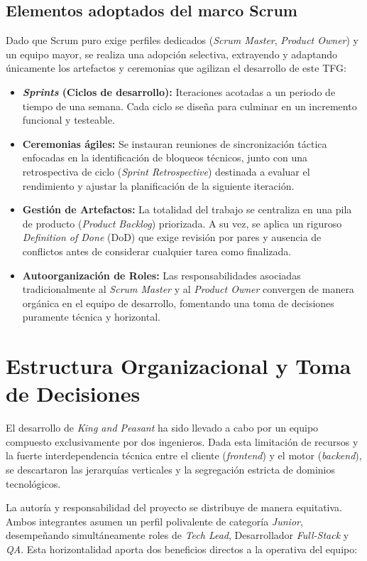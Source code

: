 \subsection{Elementos adoptados del marco Scrum}
Dado que Scrum puro exige perfiles dedicados (\textit{Scrum Master}, \textit{Product Owner}) y un equipo mayor, se realiza una adopción selectiva, extrayendo y adaptando únicamente los artefactos y ceremonias que agilizan el desarrollo de este TFG:

\begin{itemize}
    \item \textbf{\textit{Sprints} (Ciclos de desarrollo):} Iteraciones acotadas a un periodo de tiempo de una semana. Cada ciclo se diseña para culminar en un incremento funcional y testeable.
    \item \textbf{Ceremonias ágiles:} Se instauran reuniones de sincronización táctica enfocadas en la identificación de bloqueos técnicos, junto con una retrospectiva de ciclo (\textit{Sprint Retrospective}) destinada a evaluar el rendimiento y ajustar la planificación de la siguiente iteración.
    \item \textbf{Gestión de Artefactos:} La totalidad del trabajo se centraliza en una pila de producto (\textit{Product Backlog}) priorizada. A su vez, se aplica un riguroso \textit{Definition of Done} (DoD) que exige revisión por pares y ausencia de conflictos antes de considerar cualquier tarea como finalizada.
    \item \textbf{Autoorganización de Roles:} Las responsabilidades asociadas tradicionalmente al \textit{Scrum Master} y al \textit{Product Owner} convergen de manera orgánica en el equipo de desarrollo, fomentando una toma de decisiones puramente técnica y horizontal.
\end{itemize}

\section{Estructura Organizacional y Toma de Decisiones}

El desarrollo de \textit{King and Peasant} ha sido llevado a cabo por un equipo compuesto exclusivamente por dos ingenieros. Dada esta limitación de recursos y la fuerte interdependencia técnica entre el cliente (\textit{frontend}) y el motor (\textit{backend}), se descartaron las jerarquías verticales y la segregación estricta de dominios tecnológicos.

La autoría y responsabilidad del proyecto se distribuye de manera equitativa. Ambos integrantes asumen un perfil polivalente de categoría \textit{Junior}, desempeñando simultáneamente roles de \textit{Tech Lead}, Desarrollador \textit{Full-Stack} y \textit{QA}. Esta horizontalidad aporta dos beneficios directos a la operativa del equipo:

